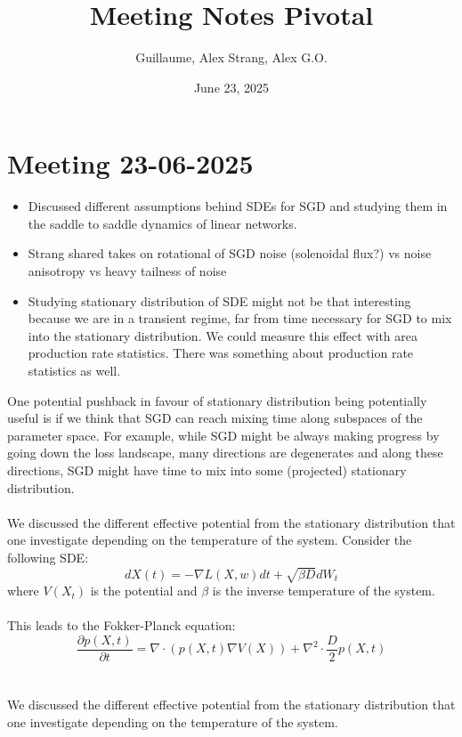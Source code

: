 \documentclass[11pt]{article}
\title{Meeting Notes Pivotal}
\author{Guillaume, Alex Strang, Alex G.O.}
\date{June 23, 2025}
\begin{document}
\maketitle
\section{Meeting 23-06-2025}
\begin{itemize}
    \item Discussed different assumptions behind SDEs for SGD and studying them in the saddle to saddle dynamics of linear networks.
    \item Strang shared takes on rotational of SGD noise (solenoidal flux?) vs noise anisotropy vs heavy tailness of noise
    \item Studying stationary distribution of SDE might not be that interesting because we are in a transient regime, far from time necessary for SGD to mix into the stationary distribution. We could measure this effect with area production rate statistics. There was something about production rate statistics as well.
\end{itemize}
One potential pushback in favour of stationary distribution being potentially useful is if we think that SGD can reach mixing time along subspaces of the parameter space. For example, while SGD might be always making progress by going down the loss landscape, many directions are degenerates and along these directions, SGD might have time to mix into some (projected) stationary distribution.
\\
\\
We discussed the different effective potential from the stationary distribution that one investigate depending on the temperature of the system.
Consider the following SDE:
\begin{equation}
    dX(t) = -\nabla L(X, w) dt + \sqrt{\beta D} dW_t
\end{equation}
where $V(X_t)$ is the  potential and $\beta$ is the inverse temperature of the system.
\\
\\
This leads to the Fokker-Planck equation:
\begin{equation}
    \frac{\partial p(X, t)}{\partial t} = \nabla \cdot (p(X, t) \nabla V(X)) + \nabla^2\cdot\frac{D}{2} p(X, t)
\end{equation}
\\
\\
We discussed the different effective potential from the stationary distribution that one investigate depending on the temperature of the system.
\end{document}
